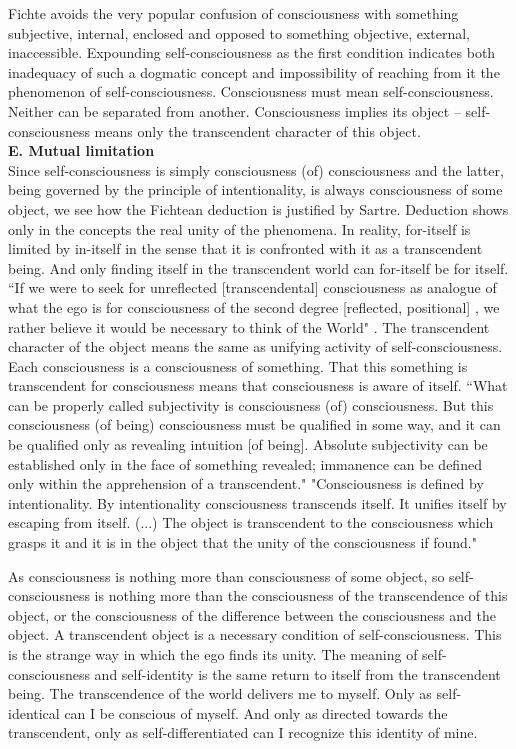 Fichte avoids the very popular confusion of consciousness with something subjective, 
internal, enclosed and 
opposed to something objective, external, inaccessible. Expounding self-consciousness as the first condition 
indicates both inadequacy of such a dogmatic concept and impossibility of reaching from it the phenomenon of 
self-consciousness. Consciousness must mean self-consciousness. Neither can be separated from another. 
Consciousness implies its object -- self-consciousness means only the transcendent character of this object. \\[1ex]
{\bf E. Mutual limitation} \\
Since self-consciousness is simply consciousness (of) consciousness and the latter, being governed by the 
principle of intentionality, is always consciousness of some object, we see how the Fichtean deduction is justified 
by Sartre. Deduction shows only in the concepts the real unity of the phenomena. In reality, for-itself is limited by 
in-itself in the sense that it is confronted with it as a transcendent being. And only finding itself in the transcendent 
world can for-itself be for itself. ``If we were to seek for unreflected [transcendental] consciousness as analogue of 
what the ego is for consciousness of the second degree [reflected, positional] , we rather believe it would be 
necessary to think of the World" \cite{ToE}. The transcendent character of the object means the same as unifying activity of 
self-consciousness. Each consciousness is a consciousness of something. That this something is transcendent for 
consciousness means that consciousness is aware of itself. ``What can be properly called subjectivity is 
consciousness (of) consciousness. But this consciousness (of being) consciousness must be qualified in some way, 
and it can be qualified only as revealing intuition [of being]. Absolute subjectivity can be established only in the 
face of something revealed; immanence can be defined only within the apprehension of a transcendent." \cite{BN}   
"Consciousness is defined by intentionality. By intentionality consciousness transcends itself. It unifies itself by 
escaping from itself. (...) The object is transcendent to the consciousness which grasps it and it is in the object 
that the unity of the consciousness if found." \cite{ToE} 

As consciousness is nothing more than consciousness of some object, so self-consciousness is nothing more 
than the consciousness of the transcendence of this object, or the consciousness of the difference between the 
consciousness and the object. A transcendent object is a necessary condition of self-consciousness. This is the 
strange way in which the ego finds its unity. The meaning of self-consciousness and self-identity is the same 
return to itself from the transcendent being. The transcendence of the world delivers me to myself. Only as self-identical can I be conscious of myself. And only as directed towards the transcendent, only as self-differentiated can 
I recognize this identity of mine.

